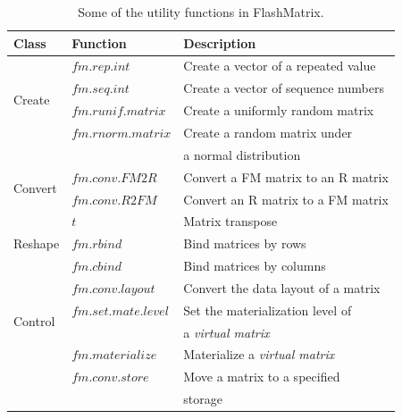\begin{table}
\begin{center}
\footnotesize
\begin{tabular}{|l|l|l|}
\hline
Class & Function & Description \\
\hline
\multirow{4}{*}{Create} & $fm.rep.int$ & Create a vector of a repeated value \\
& $fm.seq.int$ & Create a vector of sequence numbers \\
& $fm.runif.matrix$ & Create a uniformly random matrix  \\
& $fm.rnorm.matrix$ & Create a random matrix under \\ & & a normal distribution \\
\hline
\multirow{2}{*}{Convert} & $fm.conv.FM2R$ & Convert a FM matrix to an R matrix \\
& $fm.conv.R2FM$ & Convert an R matrix to a FM matrix \\
\hline
\multirow{3}{*}{Reshape} & $t$ & Matrix transpose \\
& $fm.rbind$ & Bind matrices by rows \\
& $fm.cbind$ & Bind matrices by columns \\
\hline
\multirow{4}{*}{Control} & $fm.conv.layout$ & Convert the data layout of a matrix \\
& $fm.set.mate.level$ & Set the materialization level of \\ & & a \textit{virtual matrix} \\
& $fm.materialize$ & Materialize a \textit{virtual matrix} \\
& $fm.conv.store$ & Move a matrix to a specified \\ & & storage \\
\hline
\end{tabular}
\normalsize
\end{center}
\caption{Some of the utility functions in FlashMatrix.}
\label{tbl:utility}
\end{table}

